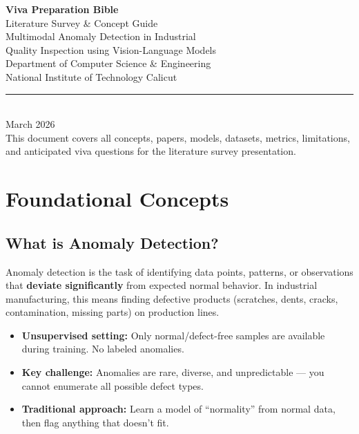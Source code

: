 \documentclass[12pt, a4paper]{article}
\begin{document}
\begin{titlepage}
\centering
\vspace*{2cm}
{\Huge\bfseries\color{keypoint} Viva Preparation Bible}\\[0.5cm]
{\LARGE\color{keypoint} Literature Survey \& Concept Guide}\\[1.5cm]
{\Large Multimodal Anomaly Detection in Industrial\\Quality Inspection using Vision-Language Models}\\[2cm]
{\large Department of Computer Science \& Engineering\\National Institute of Technology Calicut}\\[1.5cm]
\rule{0.6\textwidth}{0.5pt}\\[0.5cm]
{\large March 2026}\\[2cm]
\vfill
{\footnotesize This document covers all concepts, papers, models, datasets, metrics, limitations,\\and anticipated viva questions for the literature survey presentation.}
\end{titlepage}

\tableofcontents
\newpage


\section{Foundational Concepts}

\subsection{What is Anomaly Detection?}

Anomaly detection is the task of identifying data points, patterns, or observations that \textbf{deviate significantly} from expected normal behavior. In industrial manufacturing, this means finding defective products (scratches, dents, cracks, contamination, missing parts) on production lines.

\begin{itemize}[leftmargin=*]
    \item \textbf{Unsupervised setting:} Only normal/defect-free samples are available during training. No labeled anomalies.
    \item \textbf{Key challenge:} Anomalies are rare, diverse, and unpredictable --- you cannot enumerate all possible defect types.
    \item \textbf{Traditional approach:} Learn a model of ``normality'' from normal data, then flag anything that doesn't fit.
\end{itemize}
\end{document}
